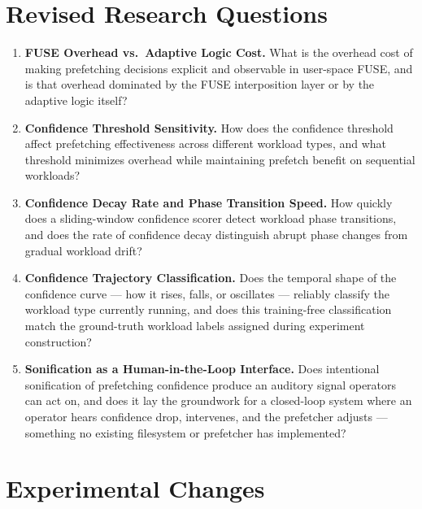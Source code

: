 \documentclass[12pt]{article}
\begin{document}
\section*{Revised Research Questions}

\begin{enumerate}

    \item \textbf{FUSE Overhead vs.\ Adaptive Logic Cost.}
    What is the overhead cost of making prefetching decisions explicit and
    observable in user-space FUSE, and is that overhead dominated by the
    FUSE interposition layer or by the adaptive logic itself?

    \item \textbf{Confidence Threshold Sensitivity.}
    How does the confidence threshold affect prefetching effectiveness across
    different workload types, and what threshold minimizes overhead while
    maintaining prefetch benefit on sequential workloads?

    \item \textbf{Confidence Decay Rate and Phase Transition Speed.}
    How quickly does a sliding-window confidence scorer detect workload phase
    transitions, and does the rate of confidence decay distinguish abrupt
    phase changes from gradual workload drift?

    \item \textbf{Confidence Trajectory Classification.}
    Does the temporal shape of the confidence curve --- how it rises, falls,
    or oscillates --- reliably classify the workload type currently running,
    and does this training-free classification match the ground-truth workload
    labels assigned during experiment construction?

    \item \textbf{Sonification as a Human-in-the-Loop Interface.}
    Does intentional sonification of prefetching confidence produce an
    auditory signal operators can act on, and does it lay the groundwork
    for a closed-loop system where an operator hears confidence drop,
    intervenes, and the prefetcher adjusts --- something no existing
    filesystem or prefetcher has implemented?

\end{enumerate}

\section*{Experimental Changes}
\end{document}
